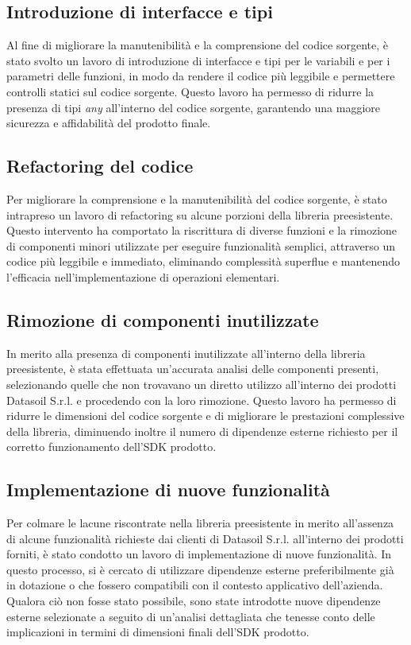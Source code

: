 \subsection{Introduzione di interfacce e tipi}
Al fine di migliorare la manutenibilità e la comprensione del codice sorgente, è stato svolto un lavoro di introduzione di interfacce e tipi per le variabili e per i parametri
delle funzioni, in modo da rendere il codice più leggibile e permettere controlli statici sul codice sorgente. \newline
Questo lavoro ha permesso di ridurre la presenza di tipi \textit{any} all'interno del codice sorgente, garantendo una maggiore sicurezza e affidabilità del prodotto finale.

\subsection{Refactoring del codice}
Per migliorare la comprensione e la manutenibilità del codice sorgente, è stato intrapreso un lavoro di refactoring su alcune porzioni della libreria preesistente.
Questo intervento ha comportato la riscrittura di diverse funzioni e la rimozione di componenti minori utilizzate per eseguire funzionalità semplici, attraverso un codice
più leggibile e immediato, eliminando complessità superflue e mantenendo l'efficacia nell'implementazione di operazioni elementari.

\subsection{Rimozione di componenti inutilizzate}
In merito alla presenza di componenti inutilizzate all'interno della libreria preesistente, è stata effettuata un'accurata analisi delle componenti presenti, selezionando
quelle che non trovavano un diretto utilizzo all'interno dei prodotti Datasoil S.r.l. e procedendo con la loro rimozione. \newline
Questo lavoro ha permesso di ridurre le dimensioni del codice sorgente e di migliorare le prestazioni complessive della libreria, diminuendo inoltre il numero di dipendenze
esterne richiesto per il corretto funzionamento dell'SDK prodotto.

\subsection{Implementazione di nuove funzionalità}
Per colmare le lacune riscontrate nella libreria preesistente in merito all'assenza di alcune funzionalità richieste dai clienti di Datasoil S.r.l. all'interno dei prodotti forniti,
è stato condotto un lavoro di implementazione di nuove funzionalità. \newline
In questo processo, si è cercato di utilizzare dipendenze esterne preferibilmente già in dotazione o che fossero compatibili con il contesto applicativo dell'azienda. Qualora ciò non
fosse stato possibile, sono state introdotte nuove dipendenze esterne selezionate a seguito di un'analisi dettagliata che tenesse conto delle implicazioni in termini di dimensioni
finali dell'SDK prodotto.

